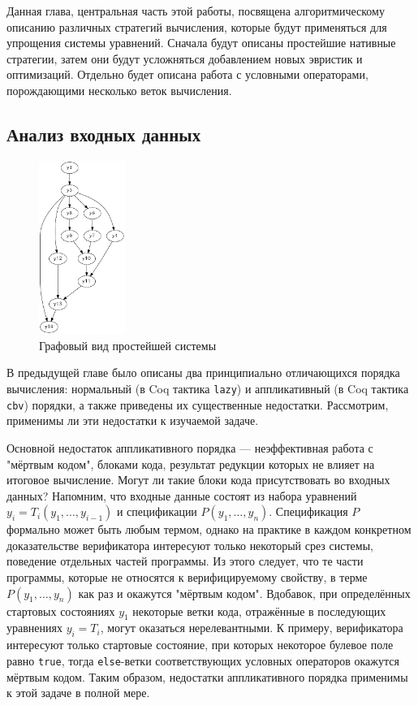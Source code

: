 \documentclass[../diploma.tex]{subfiles}
\begin{document}
\label{sec:2}
\graphicspath{ {../images/} }

Данная глава, центральная часть этой работы, посвящена алгоритмическому описанию различных стратегий вычисления, которые будут применяться для упрощения системы уравнений. Сначала будут описаны простейшие нативные стратегии, затем они будут усложняться добавлением новых эвристик и оптимизаций. Отдельно будет описана работа с условными операторами, порождающими несколько веток вычисления.

\subsection{Анализ входных данных}\label{analysis}

\begin{figure}
    \centering
    \includegraphics[width=0.25\textwidth]{graph_simple1.png}
    \caption{Графовый вид простейшей системы}\label{graph_simple1}
\end{figure}

В предыдущей главе было описаны два принципиально отличающихся порядка вычисления: нормальный (в Coq тактика \texttt{lazy}) и аппликативный (в Coq тактика \texttt{cbv}) порядки, а также приведены их существенные недостатки. Рассмотрим, применимы ли эти недостатки к изучаемой задаче.

Основной недостаток аппликативного порядка --- неэффективная работа с "мёртвым кодом", блоками кода, результат редукции которых не влияет на итоговое вычисление. Могут ли такие блоки кода присутствовать во входных данных? Напомним, что входные данные состоят из набора уравнений $y_i = T_i(y_1, \dots, y_{i - 1})$ и спецификации $P(y_1, \dots, y_n)$. Спецификация $P$ формально может быть любым термом, однако на практике в каждом конкретном доказательстве верификатора интересуют только некоторый срез системы, поведение отдельных частей программы. Из этого следует, что те части программы, которые не относятся к верифицируемому свойству, в терме $P(y_1, \dots, y_n)$ как раз и окажутся "мёртвым кодом". Вдобавок, при определённых стартовых состояниях $y_1$ некоторые ветки кода, отражённые в последующих уравнениях $y_i = T_i$, могут оказаться нерелевантными. К примеру, верификатора интересуют только стартовые состояние, при которых некоторое булевое поле равно \texttt{true}, тогда \texttt{else}-ветки соответствующих условных операторов окажутся мёртвым кодом. Таким образом, недостатки аппликативного порядка применимы к этой задаче в полной мере.
\end{document}
